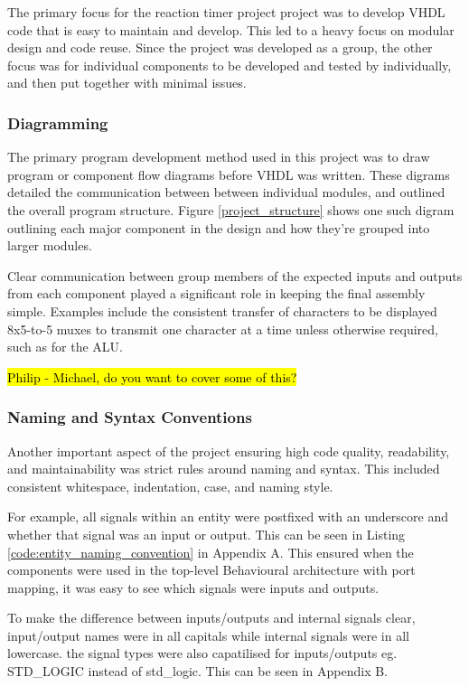 \documentclass[11pt]{article}
\begin{document}
The primary focus for the reaction timer project project was to develop VHDL code that is easy to maintain and develop. This led to a heavy focus on modular design and code reuse. Since the project was developed as a group, the other focus was for individual components to be developed and tested by individually, and then put together with minimal issues. 

\subsubsection{Diagramming}

The primary program development method used in this project was to draw program or component flow diagrams before VHDL was written. These digrams detailed the communication between between individual modules, and outlined the overall program structure. Figure \ref{project_structure} shows one such digram outlining each major component in the design and how they're grouped into larger modules. 

Clear communication between group members of the expected inputs and outputs from each component played a significant role in keeping the final assembly simple. Examples include the consistent transfer of characters to be displayed 8x5-to-5 muxes to transmit one character at a time unless otherwise required, such as for the ALU.

\hl{Philip - Michael, do you want to cover some of this?}

\subsubsection{Naming and Syntax Conventions}

Another important aspect of the project ensuring high code quality, readability, and maintainability was strict rules around naming and syntax. This included consistent whitespace, indentation, case, and naming style. 

For example, all signals within an entity were postfixed with an underscore and whether that signal was an input or output. This can be seen in Listing \ref{code:entity_naming_convention} in Appendix A. This ensured when the components were used in the top-level Behavioural architecture with port mapping, it was easy to see which signals were inputs and outputs.

To make the difference between inputs/outputs and internal signals clear, input/output names were in all capitals while internal signals were in all lowercase. the signal types were also capatilised for inputs/outputs eg. STD\_LOGIC instead of std\_logic. This can be seen in Appendix B.
\end{document}
